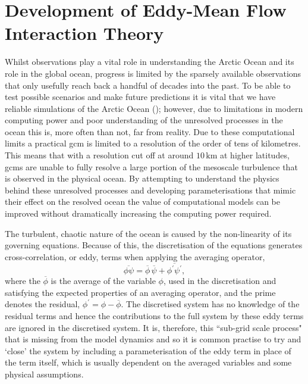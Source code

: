 \documentclass[12pt,a4paper]{report}
\newcommand*\mean[1]{\overline{#1}}
\newcommand*\res[1]{{#1}^{\prime}}
\begin{document}
\chapter{Development of Eddy-Mean Flow Interaction Theory}

\label{meaneddyinteractiontheory}

 Whilst observations play a vital role in understanding the Arctic
 Ocean and its role in the global ocean, progress is limited by the sparsely available
 observations that only usefully reach back a handful of decades into the past.
 To be able to test possible scenarios and make future predictions it is vital
 that we have reliable simulations of the Arctic Ocean (\cite{proshutinsky2008toward});
 however, due to limitations
 in modern computing power and poor understanding of the unresolved processes 
 in the ocean this is, more often than not, far from reality.
 Due to these computational limits a practical \gls{gcm} is 
 limited to a  resolution of the order of tens of kilometres. This means that with a 
 resolution  cut off at around $10 \, \mathrm{km}$ at higher latitudes, 
 \glspl{gcm} are unable to fully resolve a large portion of the mesoscale turbulence that is
 observed in the physical ocean.
 By attempting  to understand the physics behind these unresolved processes 
 and developing parameterisations that mimic their effect on the resolved ocean
 the value of computational models can be improved without dramatically increasing the
 computing power required.  
 
 The turbulent, chaotic nature of the ocean is caused by the non-linearity of its 
 governing equations. Because of this,  the discretisation of the equations generates cross-correlation, or eddy, terms when applying the 
 averaging operator,
 \begin{equation}
 \mean{\phi\psi} = \mean{\phi}\,\mean{\psi} + 
 \mean{\res{\phi}\res{\psi}},
 \label{non-lin average}
 \end{equation}
 where the ${\mean{\phi}}$ is the average of the variable ${\phi}$, used in
 the discretisation and satisfying
 the expected properties of an averaging operator, and the prime denotes the residual, ${\phi^{\prime} = \phi - \mean{\phi}}$.
 The discretised system has no knowledge of the residual terms and hence
 the contributions to the full system by these eddy terms are
 ignored in the discretised system. It is, therefore, this ``sub-grid scale process"
 that is missing from the model dynamics and so it is common practise to try and
 `close' the system by including a parameterisation of the eddy
 term in place of the term itself, which is usually dependent on the averaged 
 variables and some physical assumptions.
 
\end{document}
